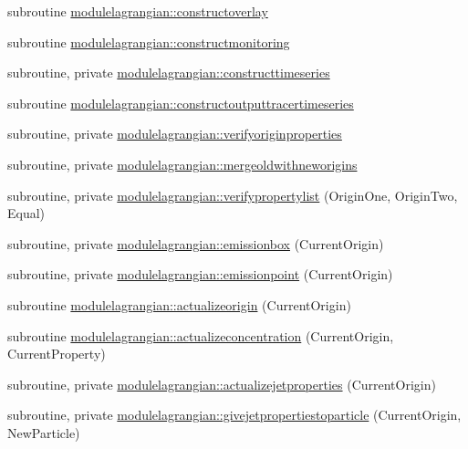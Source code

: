 \begin{DoxyCompactItemize}
\item 
subroutine \mbox{\hyperlink{namespacemodulelagrangian_a9c44a52195377ea654c3cd3d5b97acca}{modulelagrangian\+::constructoverlay}}
\item 
subroutine \mbox{\hyperlink{namespacemodulelagrangian_af8367c0c93de5218ac9c3ef7159659cf}{modulelagrangian\+::constructmonitoring}}
\item 
subroutine, private \mbox{\hyperlink{namespacemodulelagrangian_a00248d924be257777ce6bdce98029594}{modulelagrangian\+::constructtimeseries}}
\item 
subroutine \mbox{\hyperlink{namespacemodulelagrangian_acead687ed0498394f861396d605a7ce9}{modulelagrangian\+::constructoutputtracertimeseries}}
\item 
subroutine, private \mbox{\hyperlink{namespacemodulelagrangian_a3afb63d9461c6e731400252243804a3b}{modulelagrangian\+::verifyoriginproperties}}
\item 
subroutine, private \mbox{\hyperlink{namespacemodulelagrangian_aec5a7d886f857814caf3bbd5957b5359}{modulelagrangian\+::mergeoldwithneworigins}}
\item 
subroutine, private \mbox{\hyperlink{namespacemodulelagrangian_a601110ba1a707464fc0bffce5261fe4b}{modulelagrangian\+::verifypropertylist}} (Origin\+One, Origin\+Two, Equal)
\item 
subroutine, private \mbox{\hyperlink{namespacemodulelagrangian_a909284268900b0a5945c1fde9e70be9c}{modulelagrangian\+::emissionbox}} (Current\+Origin)
\item 
subroutine, private \mbox{\hyperlink{namespacemodulelagrangian_a2c2297af310e54bf92d0a22b49d375ca}{modulelagrangian\+::emissionpoint}} (Current\+Origin)
\item 
subroutine \mbox{\hyperlink{namespacemodulelagrangian_a116b4ab6ebe8a380c1f61f5764053210}{modulelagrangian\+::actualizeorigin}} (Current\+Origin)
\item 
subroutine \mbox{\hyperlink{namespacemodulelagrangian_a597916eb747603cbeb884fab22473311}{modulelagrangian\+::actualizeconcentration}} (Current\+Origin, Current\+Property)
\item 
subroutine, private \mbox{\hyperlink{namespacemodulelagrangian_a10887a715db0d544ed022e6dc66acdb2}{modulelagrangian\+::actualizejetproperties}} (Current\+Origin)
\item 
subroutine, private \mbox{\hyperlink{namespacemodulelagrangian_a71c61c30f1e91a2e99d88358b92559eb}{modulelagrangian\+::givejetpropertiestoparticle}} (Current\+Origin, New\+Particle)
\item 

\end{DoxyCompactItemize}
